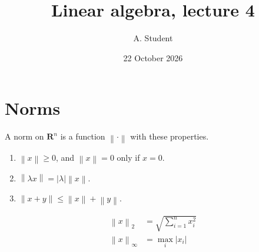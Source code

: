 \documentclass{article}
\title{Linear algebra, lecture 4}
\author{A. Student}
\date{22 October 2026}
\newcommand{\R}{\mathbf{R}}
\newcommand{\norm}[1]{\left\lVert #1 \right\rVert}
\begin{document}
\maketitle
\section{Norms}
A norm on $\R^n$ is a function $\norm{\cdot}$ with these properties.
\begin{enumerate}
  \item $\norm{x} \ge 0$, and $\norm{x} = 0$ only if $x = 0$.
  \item $\norm{\lambda x} = |\lambda| \norm{x}$.
  \item $\norm{x + y} \le \norm{x} + \norm{y}$.
\end{enumerate}
\begin{align}
  \norm{x}_2 &= \sqrt{\sum_{i=1}^{n} x_i^2} \\
  \norm{x}_\infty &= \max_i |x_i|
\end{align}
\end{document}
